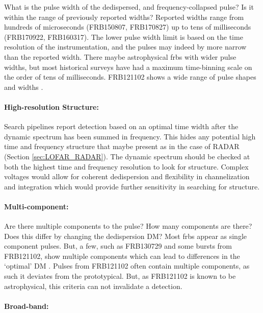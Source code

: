 \documentclass[a4paper,fleqn,usenatbib]{mnras}
\begin{document}
What is the pulse width of the dedispersed, and frequency-collapsed pulse? Is it
within the range of previously reported widths? Reported widths range from
hundreds of microseconds (FRB150807, FRB170827) up to tens of milliseconds
(FRB170922, FRB160317). The lower pulse width limit is based on the time
resolution of the instrumentation, and the pulses may indeed by more narrow than
the reported width. There maybe astrophysical \glspl{frb} with wider pulse
widths, but most historical surveys have had a maximum time-binning scale on the
order of tens of milliseconds. FRB121102 shows a wide range of pulse shapes and
widths \citep{2018Natur.553..182M,atel10675}.

\paragraph{High-resolution Structure:}

Search pipelines report detection based on an optimal time width after the
dynamic spectrum has been summed in frequency. This hides any potential high
time and frequency structure that maybe present as in the case of RADAR (Section
\ref{sec:LOFAR_RADAR}). The dynamic spectrum should be checked at both the
highest time and frequency resolution to look for structure. Complex voltages
would allow for coherent dedispersion and flexibility in channelization and
integration which would provide further sensitivity in searching for structure.

\paragraph{Multi-component:}

Are there multiple components to the pulse? How many components are there? Does
this differ by changing the dedispersion DM? Most \glspl{frb} appear as single
component pulses. But, a few, such as FRB130729 and some bursts from FRB121102,
show multiple components which can lead to differences in the `optimal' DM
\citep{2018Natur.553..182M}. Pulses from FRB121102 often contain multiple
components, as such it deviates from the prototypical. But, as FRB121102 is
known to be astrophysical, this criteria can not invalidate a detection.

\paragraph{Broad-band:}
\end{document}
